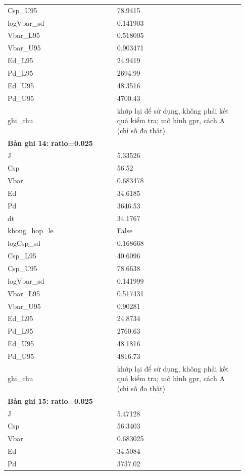 \begin{longtable}{p{0.43\linewidth}p{0.50\linewidth}}
Csp\_\allowbreak U95 & 78.9415 \\
logVbar\_\allowbreak sd & 0.141903 \\
Vbar\_\allowbreak L95 & 0.518005 \\
Vbar\_\allowbreak U95 & 0.903471 \\
Ed\_\allowbreak L95 & 24.9419 \\
Pd\_\allowbreak L95 & 2694.99 \\
Ed\_\allowbreak U95 & 48.3516 \\
Pd\_\allowbreak U95 & 4700.43 \\
ghi\_\allowbreak chu & khớp lại để sử dụng, không phải kết quả kiểm tra; mô hình gpr, cách A (chỉ số đo thật) \\
\midrule
\multicolumn{2}{p{0.95\linewidth}}{\textbf{Bản ghi 14: ratio=0.025}} \\
J & 5.33526 \\
Csp & 56.52 \\
Vbar & 0.683478 \\
Ed & 34.6185 \\
Pd & 3646.53 \\
dt & 34.1767 \\
khong\_\allowbreak hop\_\allowbreak le & False \\
logCsp\_\allowbreak sd & 0.168668 \\
Csp\_\allowbreak L95 & 40.6096 \\
Csp\_\allowbreak U95 & 78.6638 \\
logVbar\_\allowbreak sd & 0.141999 \\
Vbar\_\allowbreak L95 & 0.517431 \\
Vbar\_\allowbreak U95 & 0.90281 \\
Ed\_\allowbreak L95 & 24.8734 \\
Pd\_\allowbreak L95 & 2760.63 \\
Ed\_\allowbreak U95 & 48.1816 \\
Pd\_\allowbreak U95 & 4816.73 \\
ghi\_\allowbreak chu & khớp lại để sử dụng, không phải kết quả kiểm tra; mô hình gpr, cách A (chỉ số đo thật) \\
\midrule
\multicolumn{2}{p{0.95\linewidth}}{\textbf{Bản ghi 15: ratio=0.025}} \\
J & 5.47128 \\
Csp & 56.3403 \\
Vbar & 0.683025 \\
Ed & 34.5084 \\
Pd & 3737.02 \\

\end{longtable}
